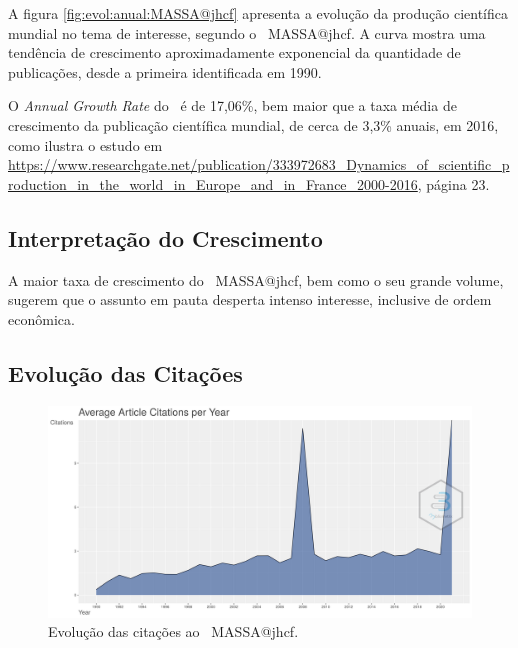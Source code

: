 A figura \ref{fig:evol:anual:MASSA@jhcf} apresenta a evolução da produção científica mundial no tema de interesse, segundo o \dataset\   MASSA@jhcf. A curva mostra uma tendência de crescimento aproximadamente exponencial da quantidade de publicações, desde a primeira identificada em 1990.

O \textit{Annual Growth Rate} do \dataset\   é de 17,06\%, bem maior que a taxa média de crescimento da publicação científica mundial, de cerca de 3,3\% anuais, em 2016, como ilustra o estudo em \url{https://www.researchgate.net/publication/333972683_Dynamics_of_scientific_production_in_the_world_in_Europe_and_in_France_2000-2016}, página 23.

\subsection{Interpretação do Crescimento} A maior taxa de crescimento do \dataset\   MASSA@jhcf, bem como o seu grande volume, sugerem que o assunto em pauta desperta intenso interesse, inclusive de ordem econômica.

\subsection{Evolução das Citações}

\begin{figure}
    \centering
    \includegraphics[width=1\textwidth]{experiments/jhcf/PesqBibliogr/SimulacaoMultiagente/WoS-20210803/classico-mais-citacoes/Dataset/AverageArticleCitationPerYear-2021-08-09.png}
    \caption{Evolução das citações ao \dataset\   MASSA@jhcf.}
    \label{fig:evol:anual:citacoes:MASSA@jhcf}
\end{figure}

